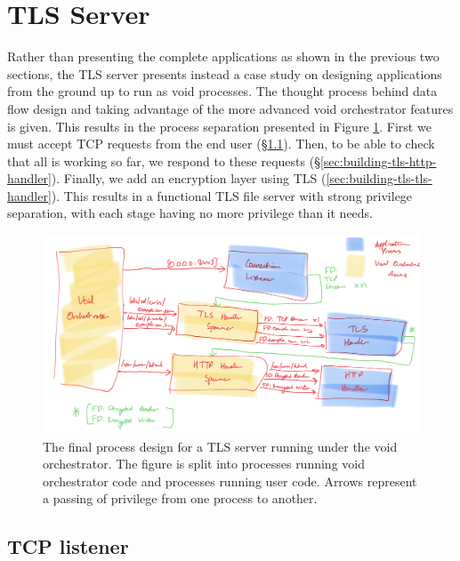 \documentclass[12pt,a4paper,twoside]{report}
\begin{document}
\section{TLS Server}
\label{sec:building-tls}

Rather than presenting the complete applications as shown in the previous two sections, the TLS server presents instead a case study on designing applications from the ground up to run as void processes. The thought process behind data flow design and taking advantage of the more advanced void orchestrator features is given. This results in the process separation presented in Figure \ref{fig:tls-server-processes}. First we must accept TCP requests from the end user (§\ref{sec:building-tls-tcp-listener}). Then, to be able to check that all is working so far, we respond to these requests (§\ref{sec:building-tls-http-handler}). Finally, we add an encryption layer using TLS (\ref{sec:building-tls-tls-handler}). This results in a functional TLS file server with strong privilege separation, with each stage having no more privilege than it needs.

\begin{figure}
    \label{fig:tls-server-processes}
    \caption{The final process design for a TLS server running under the void orchestrator. The figure is split into processes running void orchestrator code and processes running user code. Arrows represent a passing of privilege from one process to another.}

    \centering
    \includegraphics[width=\columnwidth]{figures/tls-server-splitting.png}
\end{figure}

\subsection{TCP listener}
\label{sec:building-tls-tcp-listener}
\end{document}
